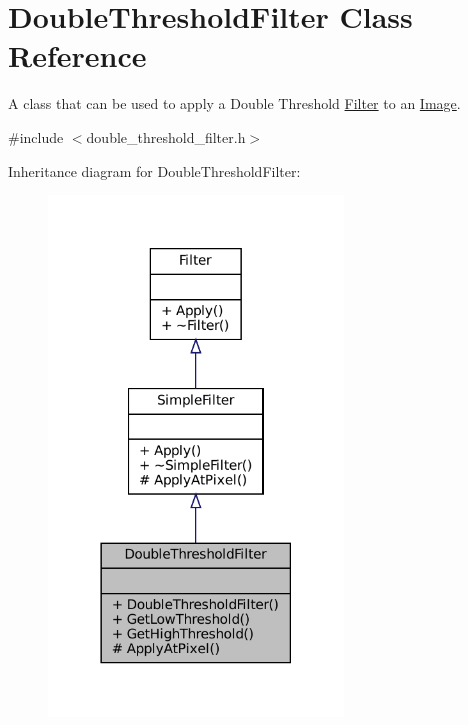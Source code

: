 \hypertarget{classDoubleThresholdFilter}{}\section{Double\+Threshold\+Filter Class Reference}
\label{classDoubleThresholdFilter}


A class that can be used to apply a Double Threshold \hyperlink{classFilter}{Filter} to an \hyperlink{classImage}{Image}.  




{\ttfamily \#include $<$double\+\_\+threshold\+\_\+filter.\+h$>$}



Inheritance diagram for Double\+Threshold\+Filter\+:\nopagebreak
\begin{figure}[H]
\begin{center}
\leavevmode
\includegraphics[width=222pt]{classDoubleThresholdFilter__inherit__graph}
\end{center}
\end{figure}


